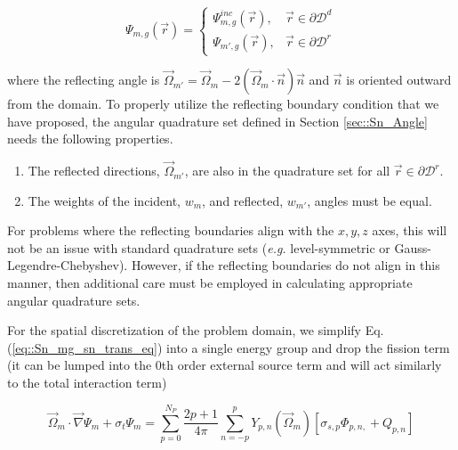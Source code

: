 \begin{equation}
\label{eq::Sn_simple_BC}
\Psi_{m,g} (\vec{r}) = \begin{cases}
	\Psi^{inc}_{m,g} (\vec{r}) , & \vec{r} \in \partial \mathcal{D}^d \\
	\Psi_{m',g} (\vec{r}) , & \vec{r} \in \partial \mathcal{D}^r
\end{cases}
\end{equation}

\noindent where the reflecting angle is $\vec{\Omega}_{m'} = \vec{\Omega}_{m} - 2 \left(  \vec{\Omega}_{m} \cdot \vec{n} \right) \vec{n}$ and $\vec{n}$ is oriented outward from the domain. To properly utilize the reflecting boundary condition that we have proposed, the angular quadrature set defined in Section \ref{sec::Sn_Angle} needs the following properties.

\begin{enumerate}
 	\item The reflected directions, $\vec{\Omega}_{m'}$, are also in the quadrature set for all $\vec{r} \in \partial \mathcal{D}^r$.
	\item The weights of the incident, $w_m$, and reflected, $w_{m'}$, angles must be equal.
\end{enumerate} 

\noindent For problems where the reflecting boundaries align with the $x,y,z$ axes, this will not be an issue with standard quadrature sets ({\em e.g.} level-symmetric or Gauss-Legendre-Chebyshev). However, if the reflecting boundaries do not align in this manner, then additional care must be employed in calculating appropriate angular quadrature sets.

For the spatial discretization of the problem domain, we simplify Eq. (\ref{eq::Sn_mg_sn_trans_eq}) into a single energy group and drop the fission term (it can be lumped into the 0th order external source term and will act similarly to the total interaction term)

\begin{equation}
\label{eq::Sn_trans_eq_simple_no_energy_groups}
\vec{\Omega}_m \cdot \vec{\nabla} \Psi_{m}  + \sigma_{t}   \Psi_{m}=  \sum_{p=0}^{N_P} \frac{2p + 1}{4 \pi}    \sum_{n=-p}^{p}  Y_{p,n} (  \vec{\Omega}_m ) \left[ \sigma_{s,p}  \Phi_{p,n,}  + Q_{p,n} \right]
\end{equation}

